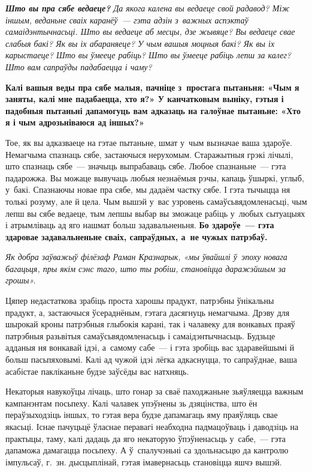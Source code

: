 \emph{\textbf{Што вы пра сябе ведаеце?} Да якога калена вы ведаеце свой радавод? Між іншым, веданьне сваіх каранёў~--- гэта адзін з~важных аспэктаў самаідэнтычнасьці. Што вы ведаеце аб месцы, дзе жывяце? Вы ведаеце свае слабыя бакі? Як вы іх абараняеце? У чым вашыя моцныя бакі? Як вы іх карыстаеце? Што вы ўмееце рабіць? Што вы ўмееце рабіць лепш за калег? Што вам сапраўды падабаецца і чаму?}

\textbf{Калі вашыя веды пра сябе малыя, пачніце з~простага пытаньня: «Чым я заняты, калі мне падабаецца, хто я?» У канчатковым выніку, гэтыя і падобныя пытаньні дапамогуць вам адказаць на галоўнае пытаньне: «Хто я і чым адрозьніваюся ад іншых?»}

Тое, як вы адказваеце на гэтае пытаньне, шмат у~чым вызначае ваша здароўе. Немагчыма спазнаць сябе, застаючыся нерухомым. Старажытныя грэкі лічылі, што спазнаць сябе~--- значыць выпрабаваць сябе. Любое спазнаньне~--- гэта падарожжа. Вы можаце вывучаць любыя незнаёмыя рэчы, капаць ўшыркі, углыб, у~бакі. Спазнаючы новае пра сябе, мы дадаём частку сябе. І гэта тычыцца ня толькі розуму, але й цела. Чым вышэй у~вас узровень самаўсьвядомленасьці, чым лепш вы сябе ведаеце, тым лепшы выбар вы зможаце рабіць у~любых сытуацыях і атрымліваць ад яго нашмат больш задавальненьня. \textbf{Бо здароўе~--- гэта здаровае задавальненьне сваіх, сапраўдных, а~не чужых патрэбаў.}

\emph{Як добра заўважыў філёзаф Раман Кразнарык, «мы ўвайшлі ў~эпоху новага багацьця, пры якім сэнс таго, што ты робіш, становіцца даражэйшым за грошы».}

Цяпер недастаткова зрабіць проста харошы прадукт, патрэбны ўнікальны прадукт, а, застаючыся ўсераднёным, гэтага дасягнуць немагчыма. Дрэву для шырокай кроны патрэбныя глыбокія карані, так і чалавеку для вонкавых праяў патрэбныя разьвітыя самаўсьвядомленасьць і самаідэнтычнасьць. Будзьце адданыя ня вонкавай ідэі, а~самому сабе~--- і гэта зробіць вас здаравейшымі й больш пасьпяховымі. Калі ад чужой ідэі лёгка адкаснуцца, то сапраўднае, ваша асабістае пакліканьне будзе заўсёды вас натхняць.

Некаторыя навукоўцы лічаць, што гонар за сваё паходжаньне зьяўляецца важным кампанэнтам посьпеху. Калі чалавек упэўнены зь дзяцінства, што ён пераўзыходзіць іншых, то гэтая вера будзе дапамагаць яму праяўляць свае якасьці. Існае пачуцьцё ўласнае перавагі неабходна падмацоўваць і даводзіць на практыцы, таму, калі дадаць да яго некаторую ўпэўненасьць у~сабе,~--- гэта дапаможа дамагацца посьпеху. А ў~спалучэньні са здольнасьцю да кантролю імпульсаў, г.~зн. дысцыплінай, гэтая імавернасьць становіцца яшчэ вышэй.

